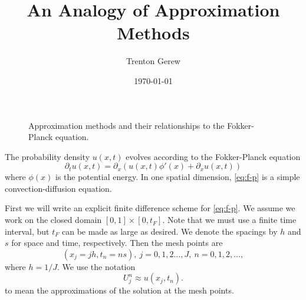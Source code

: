 \documentclass[reqno,11pt]{amsart}
\date{\today}%
\begin{document}
\title{An Analogy of Approximation Methods}
\author{Trenton Gerew}

\maketitle
	\begin{figure}[h!]
		\centering
		
		
		\caption{Approximation methods and their relationships to the Fokker-Planck equation. \label{fig:relationships}}
	\end{figure}

	The probability density $u (x,t)$ evolves according to the Fokker-Planck equation
	\begin{equation} \label{eq:f-p}
		\partial_t u (x,t) = \partial_x \left( u (x,t) \phi' (x) + \partial_x u (x,t) \right)
	\end{equation}
	where $\phi (x)$ is the potential energy.
	In one spatial dimension, \eqref{eq:f-p} is a simple convection-diffusion equation.
	
	First we will write an explicit finite difference scheme for \eqref{eq:f-p}.
	We assume we work on the closed domain $[0,1] \times [0,t_F]$.
	Note that we must use a finite time interval, but $t_F$ can be made as large as desired.
	We denote the spacings by $h$ and $s$ for space and time, respectively.
	Then the mesh points are
	\begin{equation*}
		(x_j = j h, t_n = n s), \ j = 0,1,2\dots,J, \ n = 0,1,2,\dots,
	\end{equation*}
	where $h = 1 / J$.
	We use the notation
	\begin{equation*}
		U_j^n \approx u (x_j,t_n).
	\end{equation*}
	to mean the approximations of the solution at the mesh points.
	
\end{document}
